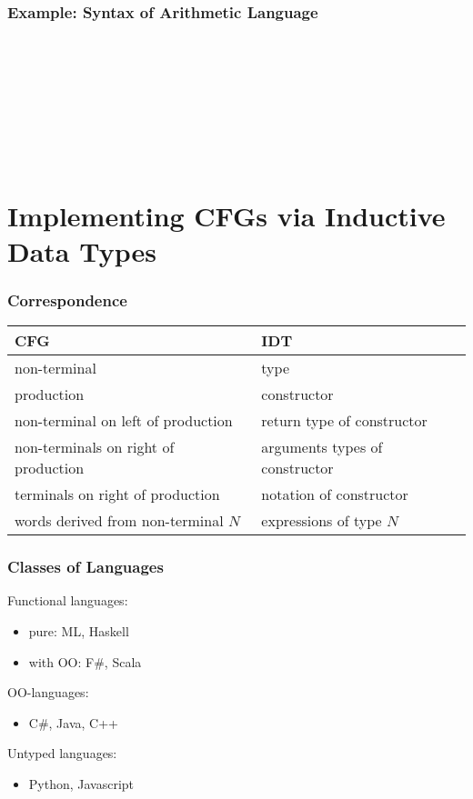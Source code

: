 \begin{frame}\frametitle{Example: Syntax of Arithmetic Language}
\begin{commgrammar}
\\
\\
\\
\\
\\
\\
\\
\end{commgrammar}
\end{frame}

\section{Implementing CFGs via Inductive Data Types}

\begin{frame}\frametitle{Correspondence}
\begin{center}
\begin{tabular}{l|l}
CFG & IDT \\
\hline
non-terminal & type \\
production & constructor \\
non-terminal on left of production & return type of constructor \\
non-terminals on right of production & arguments types of constructor \\
terminals on right of production & notation of constructor\\
words derived from non-terminal $N$ & expressions of type $N$
\end{tabular}
\end{center}
\end{frame}

\begin{frame}\frametitle{Classes of Languages}
Functional languages:
\begin{itemize}
\item pure: ML, Haskell
\item with OO: F\#, Scala
\end{itemize}

OO-languages:
\begin{itemize}
\item C\#, Java, C++
\end{itemize}

Untyped languages:
\begin{itemize}
\item Python, Javascript
\end{itemize}
\end{frame}

